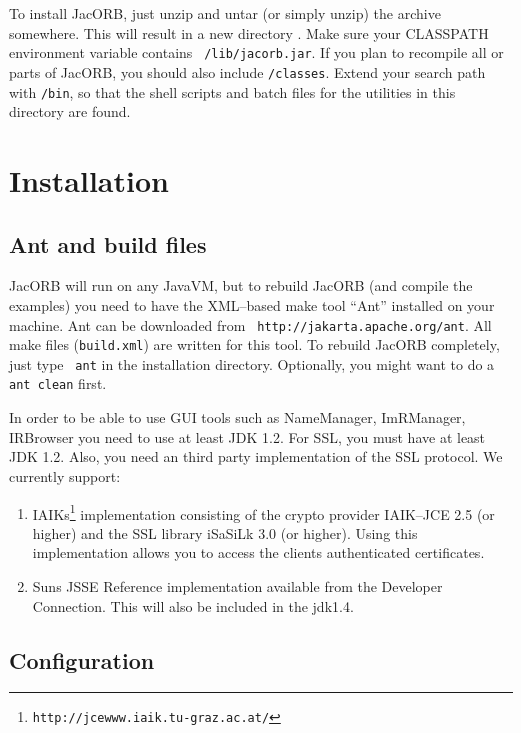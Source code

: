 \documentclass[12pt]{scrbook}
\begin{document}
To install JacORB, just unzip  and untar (or simply unzip) the archive
somewhere.  This will result  in a new directory {\tt \JacORBDir}.
Make   sure  your   CLASSPATH  environment   variable   contains  {\tt
\JacORBDir/lib/jacorb.jar}.  If you plan to recompile all or parts
of  JacORB,  you  should  also include  {\tt  \JacORBDir/classes}.
Extend  your search path  with {\tt  \JacORBDir/bin}, so  that the
shell scripts and batch files  for the utilities in this directory are
found.

\section{Installation}
\label{Sec_installation}

\subsection{Ant and build files}

JacORB will run on any JavaVM,  but to rebuild JacORB (and compile the
 examples) you need to have the XML--based make tool ``Ant'' installed
 on    your   machine.    Ant    can   be    downloaded   from    {\tt
 http://jakarta.apache.org/ant}. All make  files ({\tt build.xml}) are
 written for this  tool. To rebuild JacORB completely,  just type {\tt
 ant} in the installation directory.  Optionally, you might want to do
 a {\tt ant clean} first.

In order to be able to  use GUI tools such as NameManager, ImRManager,
IRBrowser you need to use at least  JDK 1.2. For SSL, you must have at
least JDK  1.2.  Also,  you need an third party implementation of the SSL
protocol. We currently support:
\begin{enumerate}
\item IAIKs\footnote{{\tt http://jcewww.iaik.tu-graz.ac.at/}} implementation
  consisting of the crypto provider IAIK--JCE 2.5 (or higher) and the SSL
  library iSaSiLk 3.0 (or higher). Using this implementation allows you to
  access the clients authenticated certificates.
\item Suns JSSE Reference implementation available from the Developer
  Connection. This will also be included in the jdk1.4.
\end{enumerate}

\subsection{Configuration}
\label{configuration}
\end{document}
